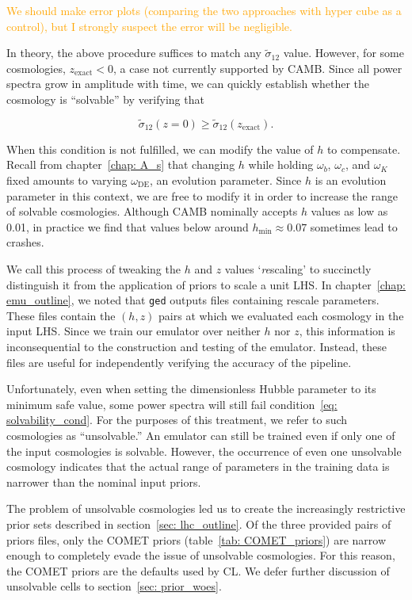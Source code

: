 \textcolor{orange}{We should make error plots (comparing the two approaches 
with hyper cube as a control), but I strongly suspect the error will be 
negligible.}

In theory, the above procedure suffices to match any $\tilde{\sigma}_{12}$
value. However, for some cosmologies, $z_\text{exact} < 0$, a case not
currently supported by CAMB. Since all power spectra grow in amplitude with
time, we can quickly establish whether the cosmology is ``solvable'' by
verifying that

\begin{equation}
\label{eq: solvability_cond}
\tilde{\sigma}_{12}(z = 0) \geq \tilde{\sigma}_{12}(z_\text{exact})
.\end{equation}

When this condition is not fulfilled, we can modify the value of $h$ to
compensate. Recall from chapter~\ref{chap: A_s} that changing $h$ while
holding $\omega_b$, $\omega_c$, and $\omega_K$ fixed amounts to varying
$\omega_\text{DE}$, an evolution parameter. Since $h$ is an evolution
parameter in this context, we are free to modify it in order to increase the
range of solvable cosmologies. Although CAMB nominally accepts $h$ values as
low as 0.01, in practice we find that values below around
$h_\text{min} \approx 0.07$ sometimes lead to crashes.

We call this process of tweaking the $h$ and $z$ values
`\textit{re}scaling' to
succinctly distinguish it from the application of priors to scale a unit LHS.
In chapter~\ref{chap: emu_outline}, we noted that \texttt{ged} outputs
files containing rescale parameters. These files contain the $(h, z)$ pairs
at which we evaluated each cosmology in the input LHS. Since we train our
emulator over neither $h$ nor $z$, this information is inconsequential to the
construction and testing of the emulator. Instead, these files are useful for
independently verifying the accuracy of the pipeline.

Unfortunately, even when setting the dimensionless Hubble parameter to its
minimum safe value, some power spectra will still fail
condition~\ref{eq: solvability_cond}.
For the purposes of this treatment, we refer to such cosmologies as
``unsolvable.'' An emulator can still be trained even if only one of the input 
cosmologies is solvable. However, the occurrence of even one
unsolvable cosmology indicates that the actual range of parameters in the
training data is narrower than the nominal input priors. 

The problem of unsolvable cosmologies led us to create the
increasingly restrictive prior sets described in
section~\ref{sec: lhc_outline}.
Of the three provided pairs of priors files, only the COMET priors
(table~\ref{tab: COMET_priors}) are narrow enough to completely evade the 
issue of unsolvable cosmologies. For this reason, the COMET priors are the
defaults used by CL. We defer further discussion of unsolvable cells to
section~\ref{sec: prior_woes}.

